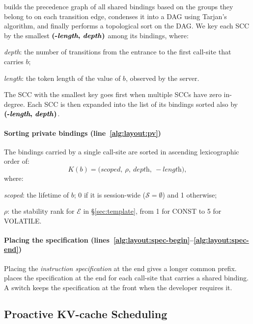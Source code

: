\sysname builds the precedence graph of all shared bindings based on the groups they belong to on each transition edge, condenses it into a DAG using Tarjan's algorithm, and finally performs a topological sort on the DAG. We key each SCC by the smallest $\textbf{(-\textit{length}, \textit{depth})}$ among its bindings, where:
\begin{enumerate*}[label=\textbf{(\roman*)}]
    \item \textit{depth}: the number of transitions from the entrance to the first call-site that carries $b$;
    \item \textit{length}: the token length of the value of $b$, observed by the server.
\end{enumerate*}
The SCC with the smallest key goes first when multiple SCCs have zero in-degree. Each SCC is then expanded into the list of its bindings sorted also by $\textbf{(-\textit{length}, \textit{depth})}$.

\paragraph{Sorting private bindings {\normalfont(line~\ref{alg:layout:pv})}} The bindings carried by a single call-site are sorted in ascending lexicographic order of:
\[
K(b)=\big(\textit{scoped},\ \rho,\ \textit{depth},\ -\textit{length}\big),
\]
where:
\begin{enumerate*}[label=\textbf{(\roman*)}]
    \item \textit{scoped}: the lifetime of $b$; 0 if it is session-wide ($\mathcal{S}=\emptyset$) and 1 otherwise;
    \item $\rho$: the stability rank for $\mathcal{E}$ in \S\ref{sec:template}, from 1 for CONST to 5 for VOLATILE.
\end{enumerate*}


\paragraph{Placing the specification {\normalfont(lines~\ref{alg:layout:spec-begin}--\ref{alg:layout:spec-end})}} 
Placing the \emph{instruction specification} at the end gives a longer common prefix. \sysname places the specification at the end for each call-site that carries a shared binding. A switch keeps the specification at the front when the developer requires it. 



\subsection{Proactive KV-cache Scheduling}
\label{sec:Proactive KV-Cache Scheduling}

